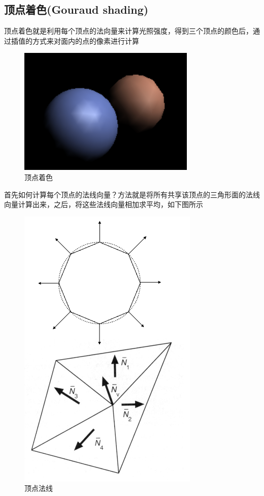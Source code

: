 \subsection*{顶点着色(Gouraud shading)}

顶点着色就是利用每个顶点的法向量来计算光照强度，得到三个顶点的颜色后，通过插值的方式来对面内的点的像素进行计算
\begin{figure}[H]
    \centering
    \includegraphics[scale=0.6]{figures/顶点着色.png}
    \caption[short]{顶点着色}
\end{figure}

首先如何计算每个顶点的法线向量？方法就是将所有共享该顶点的三角形面的法线向量计算出来，之后，将这些法线向量相加求平均，如下图所示
\begin{figure}[H]
    \centering
    \includegraphics[scale=0.5]{figures/顶点法向量.png}
    \caption[short]{顶点法线}
\end{figure}

